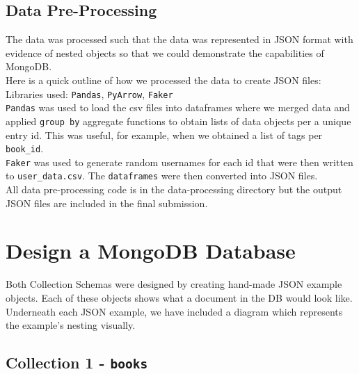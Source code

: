 \documentclass[11pt]{article}
\begin{document}
\subsection{Data Pre-Processing}
\label{sec:org565b93f}
The data was processed such that the data was represented in JSON format with evidence of nested objects so that we could demonstrate the capabilities of MongoDB.\\
\linebreak
Here is a quick outline of how we processed the data to create JSON files:\\
Libraries used: \texttt{Pandas}, \texttt{PyArrow}, \texttt{Faker}\\
\linebreak
\texttt{Pandas} was used to load the csv files into dataframes where we merged data and applied \texttt{group by} aggregate functions to obtain lists of data objects per a unique entry id. This was useful, for example, when we obtained a list of tags per \texttt{book\_id}.\\
\linebreak
\texttt{Faker} was used to generate random usernames for each id that were then written to \texttt{user\_data.csv}. The \texttt{dataframes} were then converted into JSON files.\\
\linebreak
All data pre-processing code is in the data-processing directory but the output JSON files are included in the final submission.
\section{Design a MongoDB Database}
\label{sec:orgd79d75a}
Both Collection Schemas were designed by creating hand-made JSON example objects. Each of these objects shows what a document in the DB would look like. Underneath each JSON example, we have included a diagram which represents the example's nesting visually.
\subsection{Collection 1 - \texttt{books}}
\label{sec:org1036276}
\end{document}
